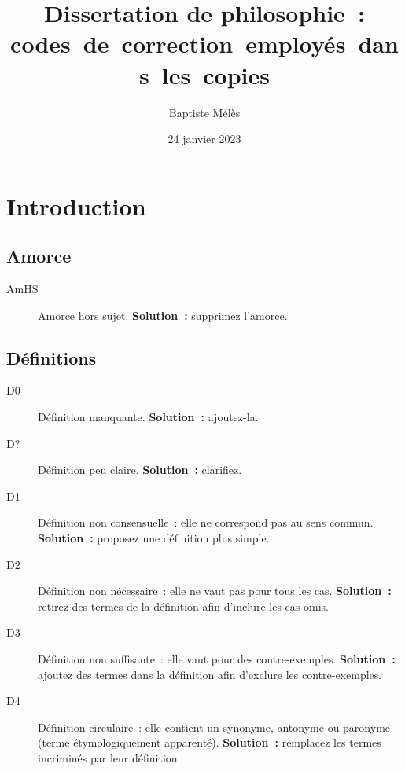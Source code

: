 \documentclass[a4paper,11pt]{article}
\author{Baptiste Mélès}
\date{24 janvier 2023}
\title{Dissertation de philosophie : codes de correction employés dans les copies}
\begin{document}
\maketitle

\section{Introduction}
\label{sec:org95b1db2}

\subsection{Amorce}
\label{sec:org75539d9}
\begin{description}
\item[{AmHS}] Amorce hors sujet. \textbf{Solution :} supprimez l'amorce.
\end{description}

\subsection{Définitions}
\label{sec:org69c6ea0}
\begin{description}
\item[{D0}] Définition manquante. \textbf{Solution :} ajoutez-la.
\item[{D\string?}] Définition peu claire. \textbf{Solution :} clarifiez.
\item[{D1}] Définition non consensuelle : elle ne correspond pas au sens
commun. \textbf{Solution :} proposez une définition plus simple.
\item[{D2}] Définition non nécessaire : elle ne vaut pas pour tous les cas.
\textbf{Solution :} retirez des termes de la définition afin d'inclure les
cas omis.
\item[{D3}] Définition non suffisante : elle vaut pour des contre-exemples.
\textbf{Solution :} ajoutez des termes dans la définition afin d'exclure les
contre-exemples.
\item[{D4}] Définition circulaire : elle contient un synonyme, antonyme ou
paronyme (terme étymologiquement apparenté). \textbf{Solution :} remplacez
les termes incriminés par leur définition.
\end{description}
\end{document}
